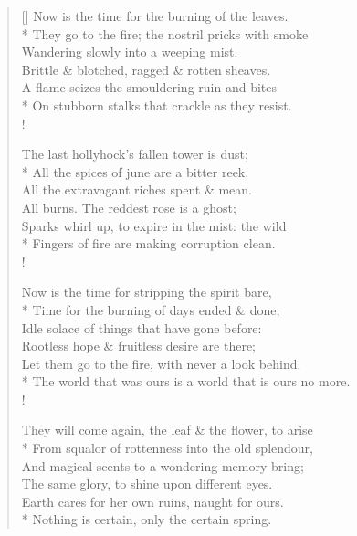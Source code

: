 \documentclass[MAIN]{subfiles}
\begin{document}
\settowidth{\versewidth}{\vin They go to the fire; the nostril pricks with smoke}
\begin{verse}[\versewidth]
Now is the time for the burning of the leaves.\\*
\vin They go to the fire; the nostril pricks with smoke\\
\vin \vin Wandering slowly into a weeping mist.\\
Brittle \& blotched, ragged \& rotten sheaves.\\
\vin A flame seizes the smouldering ruin and bites\\*
\vin \vin On stubborn stalks that crackle as they resist.\\!

The last hollyhock's fallen tower is dust;\\*
\vin All the spices of june are a bitter reek,\\
\vin \vin All the extravagant riches spent \& mean.\\
All burns. The reddest rose is a ghost;\\
\vin Sparks whirl up, to expire in the mist: the wild\\*
\vin \vin Fingers of fire are making corruption clean.\\!

Now is the time for stripping the spirit bare,\\*
\vin Time for the burning of days ended \& done,\\
\vin \vin Idle solace of things that have gone before:\\
Rootless hope \& fruitless desire are there;\\
\vin Let them go to the fire, with never a look behind.\\*
\vin \vin The world that was ours is a world that is ours no more.\\!

They will come again, the leaf \& the flower, to arise\\*
\vin From squalor of rottenness into the old splendour,\\
\vin \vin And magical scents to a wondering memory bring;\\
The same glory, to shine upon different eyes.\\
\vin Earth cares for her own ruins, naught for ours.\\*
\vin \vin Nothing is certain, only the certain spring.
\end{verse}
\end{document}
